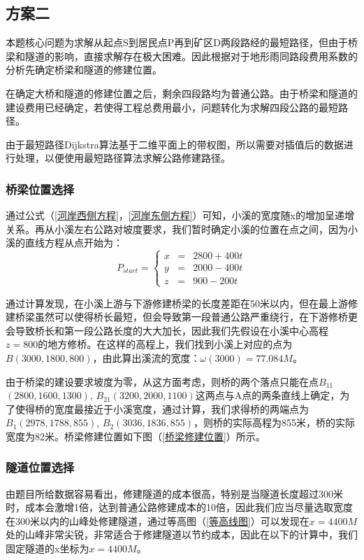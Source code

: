 \documentclass[bwprint]{cumcmthesis}
\begin{document}
\subsection{方案二}
本题核心问题为求解从起点S到居民点P再到矿区D两段路经的最短路径，但由于桥梁和隧道的影响，直接求解存在极大困难。因此根据对于地形雨同路段费用系数的分析先确定桥梁和隧道的修建位置。

在确定大桥和隧道的修建位置之后，剩余四段路均为普通公路。由于桥梁和隧道的建设费用已经确定，若使得工程总费用最小，问题转化为求解四段公路的最短路径。

由于最短路径Dijkstra算法基于二维平面上的带权图，所以需要对插值后的数据进行处理，以便使用最短路径算法求解公路修建路径。

\subsubsection{桥梁位置选择}
通过公式（\ref{河岸西侧方程}，\ref{河岸东侧方程}）可知，小溪的宽度随x的增加呈递增关系。再从小溪左右公路对坡度要求，我们暂时确定小溪的位置在点之间，因为小溪的直线方程从点开始为：
$$ P_{start}=\left\{
\begin{aligned}
x & = & 2800+400t \\
y & = & 2000-400t \\
z & = & 900-200t
\end{aligned}
\right.
$$

通过计算发现，在小溪上游与下游修建桥梁的长度差距在50米以内，但在最上游修建桥梁虽然可以使得桥长最短，但会导致第一段普通公路严重绕行，在下游修桥更会导致桥长和第一段公路长度的大大加长，因此我们先假设在小溪中心高程$z=800$的地方修桥。在这样的高程上，我们找到小溪上对应的点为$B(3000,1800,800)$，由此算出溪流的宽度：$\omega(3000)=77.084M$。

由于桥梁的建设要求坡度为零，从这方面考虑，则桥的两个落点只能在点$B_{11}$
$(2800,1600,1300)$,
$B_{21}(3200,2000,1100)$这两点与A点的两条直线上确定，为了使得桥的宽度最接近于小溪宽度，通过计算，我们求得桥的两端点为$B_{1}(2978,1788,855)$,
$B_{2}(3036,1836,855)$，则桥的实际高程为855米，桥的实际宽度为82米。桥梁修建位置如下图（\ref{桥梁修建位置}）所示。

\subsubsection{隧道位置选择}
由题目所给数据容易看出，修建隧道的成本很高，特别是当隧道长度超过300米时，成本会激增1倍，达到普通公路修建成本的10倍，因此我们应当尽量选取宽度在300米以内的山峰处修建隧道，通过等高图（\ref{等高线图}）可以发现在$x=4400M$处的山峰非常尖锐，非常适合于修建隧道以节约成本，因此在以下的计算中，我们固定隧道的x坐标为$x=4400M$。
\end{document}

